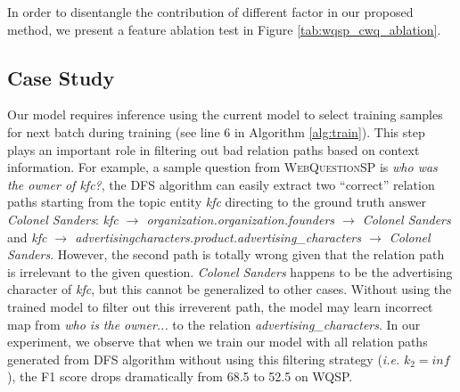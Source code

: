\begin{table}[h]\centering
{}
\caption{\fontsize{10}{12}\selectfont We report F1 and standard deviation. \textsc{BEST} represents XXX.}\label{tab:wqsp_cwq_ablation}
\end{table}

In order to disentangle the contribution of different factor in our proposed method, we present a feature ablation test in Figure \ref{tab:wqsp_cwq_ablation}.

\subsection{Case Study}


Our model requires inference using the current model to select training samples for next batch during training (see line 6 in Algorithm \ref{alg:train}). This step plays an important role in filtering out bad relation paths based on context information. For example, a sample question from \textsc{WebQuestionSP} is \textit{who was the owner of kfc?}, the DFS algorithm can easily extract two ``correct'' relation paths starting from the topic entity \textit{kfc} directing to the ground truth answer \textit{Colonel Sanders}: \textit{kfc $\rightarrow$ organization.organization.founders $\rightarrow$ Colonel Sanders} and \textit{kfc $\rightarrow$ advertisingcharacters.product.advertising\_characters $\rightarrow$ Colonel Sanders}. However, the second path is totally wrong given that the relation path is irrelevant to the given question. \textit{Colonel Sanders} happens to be the advertising character of \textit{kfc}, but this cannot be generalized to other cases. Without using the trained model to filter out this irreverent path, the model may learn incorrect map from \textit{who is the owner...} to the relation \textit{advertising\_characters}. In our experiment, we observe that when we train our model with all relation paths generated from DFS algorithm without using this filtering strategy (\emph{i.e.} $k_2=inf$), the F1 score drops dramatically from 68.5 to 52.5 on WQSP.




